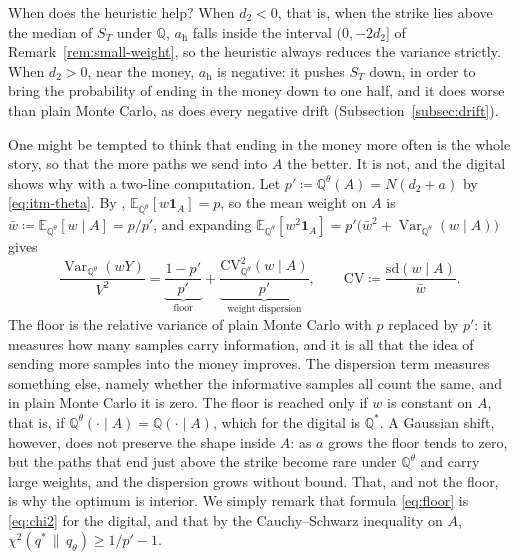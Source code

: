 \documentclass[11pt,a4paper]{article}
\theoremstyle{plain}
\theoremstyle{definition}
\theoremstyle{remark}
\newcommand{\E}{\mathbb{E}}
\newcommand{\Q}{\mathbb{Q}}
\newcommand{\1}{\mathbf{1}}
\newcommand{\eqdef}{\coloneqq}
\newcommand{\Var}{\operatorname{Var}}
\newcommand{\Qt}{\Q^{\theta}}
\begin{document}
When does the heuristic help? When $d_2 < 0$, that is, when the strike lies above the median of $S_T$ under $\Q$, $a_{\mathrm h}$ falls inside the interval $(0, -2d_2]$ of Remark~\ref{rem:small-weight}, so the heuristic always reduces the variance strictly. When $d_2 > 0$, near the money, $a_{\mathrm h}$ is negative: it pushes $S_T$ down, in order to bring the probability of ending in the money down to one half, and it does worse than plain Monte Carlo, as does every negative drift (Subsection~\ref{subsec:drift}).

One might be tempted to think that ending in the money more often is the whole story, so that the more paths we send into $A$ the better. It is not, and the digital shows why with a two-line computation. Let $p' \eqdef \Qt(A) = N(d_2 + a)$ by \eqref{eq:itm-theta}. By \cite[(4.24)]{tfg}, $\E_{\Qt}[w\1_A] = p$, so the mean weight on $A$ is $\bar w \eqdef \E_{\Qt}[w \mid A] = p/p'$, and expanding $\E_{\Qt}[w^2\1_A] = p'\bigl(\bar w^2 + \Var_{\Qt}(w \mid A)\bigr)$ gives
\begin{equation}\label{eq:floor}
  \frac{\Var_{\Qt}(wY)}{V^2} = \underbrace{\frac{1 - p'}{p'}}_{\text{floor}} + \underbrace{\frac{\mathrm{CV}^2_{\Qt}(w \mid A)}{p'}}_{\text{weight dispersion}},
  \qquad \mathrm{CV} \eqdef \frac{\mathrm{sd}(w \mid A)}{\bar w}.
\end{equation}
The floor is the relative variance of plain Monte Carlo with $p$ replaced by $p'$: it measures how many samples carry information, and it is all that the idea of sending more samples into the money improves. The dispersion term measures something else, namely whether the informative samples all count the same, and in plain Monte Carlo it is zero. The floor is reached only if $w$ is constant on $A$, that is, if $\Qt(\cdot \mid A) = \Q(\cdot \mid A)$, which for the digital is $\Q^*$. A Gaussian shift, however, does not preserve the shape inside $A$: as $a$ grows the floor tends to zero, but the paths that end just above the strike become rare under $\Qt$ and carry large weights, and the dispersion grows without bound. That, and not the floor, is why the optimum is interior. We simply remark that formula \eqref{eq:floor} is \eqref{eq:chi2} for the digital, and that by the Cauchy--Schwarz inequality on $A$, $\chi^2(q^* \,\|\, q_\theta) \ge 1/p' - 1$.
\end{document}
